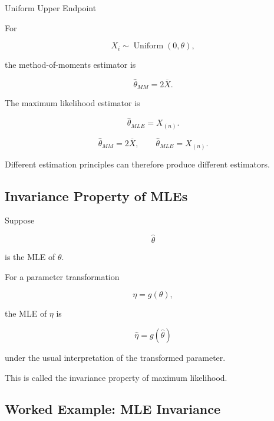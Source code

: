 \begin{workedexamplebox}{Uniform Upper Endpoint}

For

\[
X_i
\sim
\operatorname{Uniform}(0,\theta),
\]

the method-of-moments estimator is

\[
\widehat{\theta}_{MM}
=
2\overline{X}.
\]

The maximum likelihood estimator is

\[
\widehat{\theta}_{MLE}
=
X_{(n)}.
\]

\begin{answerbox}
\[
\boxed{
\widehat{\theta}_{MM}=2\overline{X},
\qquad
\widehat{\theta}_{MLE}=X_{(n)}.
}
\]
\end{answerbox}

Different estimation principles can therefore produce different
estimators.

\end{workedexamplebox}

\subsection{Invariance Property of MLEs}
\label{subsec:mle-invariance}

Suppose

\[
\widehat{\theta}
\]

is the MLE of \(\theta\).

For a parameter transformation

\[
\eta=g(\theta),
\]

the MLE of \(\eta\) is

\[
\boxed{
\widehat{\eta}
=
g(\widehat{\theta})
}
\]

under the usual interpretation of the transformed parameter.

This is called the invariance property of maximum likelihood.

\subsection{Worked Example: MLE Invariance}
\label{subsec:worked-mle-invariance}

